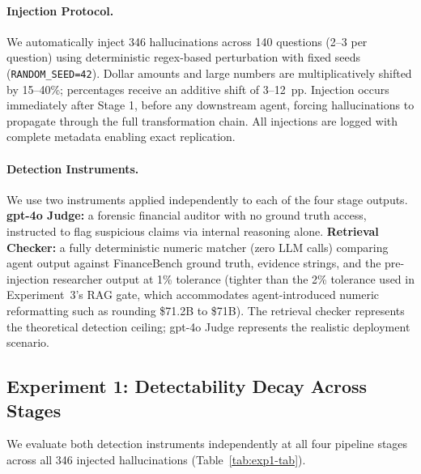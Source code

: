 \documentclass{article}
\theoremstyle{plain}
\theoremstyle{definition}
\theoremstyle{remark}
\begin{document}
\paragraph{Injection Protocol.} We automatically inject 346 hallucinations across 140 questions (2--3 per question) using deterministic regex-based perturbation with fixed seeds (\texttt{RANDOM\_SEED=42}). Dollar amounts and large numbers are multiplicatively shifted by 15--40\%; percentages receive an additive shift of 3--12~pp. Injection occurs immediately after Stage 1, before any downstream agent, forcing hallucinations to propagate through the full transformation chain. All injections are logged with complete metadata enabling exact replication.

\paragraph{Detection Instruments.} We use two instruments applied independently to each of the four stage outputs. \textbf{gpt-4o Judge:} a forensic financial auditor with no ground truth access, instructed to flag suspicious claims via internal reasoning alone. \textbf{Retrieval Checker:} a fully deterministic numeric matcher (zero LLM calls) comparing agent output against FinanceBench ground truth, evidence strings, and the pre-injection researcher output at 1\% tolerance (tighter than the 2\% tolerance used in Experiment~3's RAG gate, which accommodates agent-introduced numeric reformatting such as rounding \$71.2B to \$71B). The retrieval checker represents the theoretical detection ceiling; gpt-4o Judge represents the realistic deployment scenario.

\subsection{Experiment 1: Detectability Decay Across Stages}
\label{sec:exp1}

We evaluate both detection instruments independently at all four pipeline stages across all 346 injected hallucinations (Table~\ref{tab:exp1-tab}).
\end{document}

